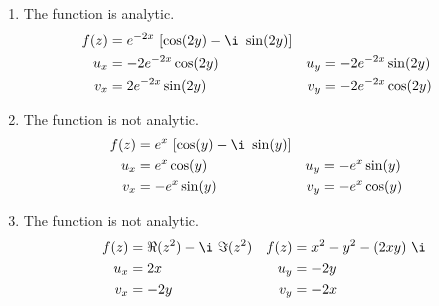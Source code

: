\begin{enumerate}
    \item The function is \textcolor{y_h}{analytic}.
          \begin{align}
              f(z) & = e^{-2x}\ [\cos(2y) - \i\ \sin(2y)]   \\
              u_x  & = -2e^{-2x} \cos(2y)                 &
              u_y  & = -2e^{-2x} \sin(2y)                   \\
              v_x  & = 2e^{-2x} \sin(2y)                  &
              v_y  & = -2e^{-2x} \cos(2y)
          \end{align}

    \item The function is \textcolor{y_p}{not analytic}.
          \begin{align}
              f(z) & = e^{x}\ [\cos(y) - \i\ \sin(y)]   \\
              u_x  & = e^{x} \cos(y)                  &
              u_y  & = -e^{x} \sin(y)                   \\
              v_x  & = -e^{x} \sin(y)                 &
              v_y  & = -e^{x} \cos(y)
          \end{align}

    \item The function is \textcolor{y_p}{not analytic}.
          \begin{align}
              f(z) & = \Re{(z^2)} - \i\ \Im{(z^2)} &
              f(z) & = x^2 - y^2 - (2xy)\ \i         \\
              u_x  & = 2x                          &
              u_y  & = -2y                           \\
              v_x  & = -2y                         &
              v_y  & = -2x
          \end{align}


\end{enumerate}
